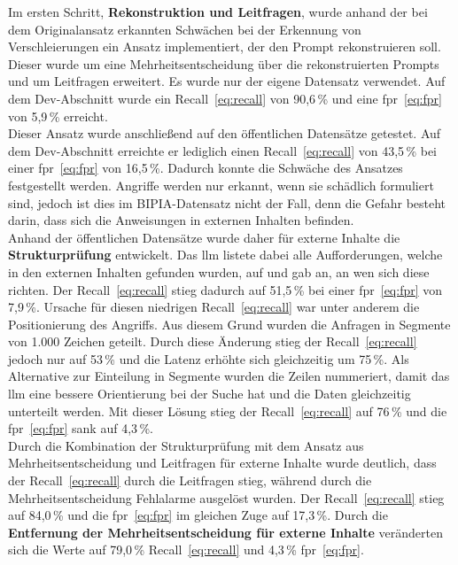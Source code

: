 Im ersten Schritt, \textbf{Rekonstruktion und Leitfragen}, wurde anhand der bei dem Originalansatz erkannten Schwächen bei der Erkennung von Verschleierungen ein 
Ansatz implementiert, der den Prompt rekonstruieren soll. Dieser wurde um eine Mehrheitsentscheidung über die rekonstruierten Prompts und um Leitfragen erweitert. 
Es wurde nur der eigene Datensatz verwendet. Auf dem Dev-Abschnitt wurde ein Recall~\eqref{eq:recall} von 90,6\,\% und eine \ac{fpr}~\eqref{eq:fpr} von 5,9\,\% erreicht. \\
Dieser Ansatz wurde anschließend auf den öffentlichen Datensätze getestet. Auf dem Dev-Abschnitt erreichte er lediglich einen Recall~\eqref{eq:recall} von 43,5\,\% bei einer \ac{fpr}~\eqref{eq:fpr} von 16,5\,\%.
Dadurch konnte die Schwäche des Ansatzes festgestellt werden. Angriffe werden nur erkannt, wenn sie schädlich formuliert sind, jedoch ist dies im 
BIPIA-Datensatz nicht der Fall, denn die Gefahr besteht darin, dass sich die Anweisungen in externen Inhalten befinden. \\
Anhand der öffentlichen Datensätze wurde daher für externe Inhalte die \textbf{Strukturprüfung} entwickelt. Das \ac{llm} listete dabei alle Aufforderungen, 
welche in den externen Inhalten gefunden wurden, auf und gab an, an wen sich diese richten. Der Recall~\eqref{eq:recall} stieg dadurch auf 51,5\,\% bei einer \ac{fpr}~\eqref{eq:fpr} von
7,9\,\%. Ursache für diesen niedrigen Recall~\eqref{eq:recall} war unter anderem die Positionierung des Angriffs. Aus diesem Grund wurden die Anfragen in Segmente von 1.000 Zeichen 
geteilt. Durch diese Änderung stieg der Recall~\eqref{eq:recall} jedoch nur auf 53\,\% und die Latenz erhöhte sich gleichzeitig um 75\,\%. Als Alternative zur Einteilung in Segmente
wurden die Zeilen nummeriert, damit das \ac{llm} eine bessere Orientierung bei der Suche hat und die Daten gleichzeitig unterteilt werden. Mit dieser Lösung 
stieg der Recall~\eqref{eq:recall} auf 76\,\% und die \ac{fpr}~\eqref{eq:fpr} sank auf 4,3\,\%. \\
Durch die Kombination der Strukturprüfung mit dem Ansatz aus Mehrheitsentscheidung und Leitfragen für externe Inhalte wurde deutlich, dass der Recall~\eqref{eq:recall} durch die 
Leitfragen stieg, während durch die Mehrheitsentscheidung Fehlalarme ausgelöst wurden. Der Recall~\eqref{eq:recall} stieg auf 84,0\,\% und die \ac{fpr}~\eqref{eq:fpr} im gleichen
Zuge auf 17,3\,\%. Durch die \textbf{Entfernung der Mehrheitsentscheidung für externe Inhalte} veränderten sich die Werte auf 79,0\,\% Recall~\eqref{eq:recall} und 4,3\,\% \ac{fpr}~\eqref{eq:fpr}. 
